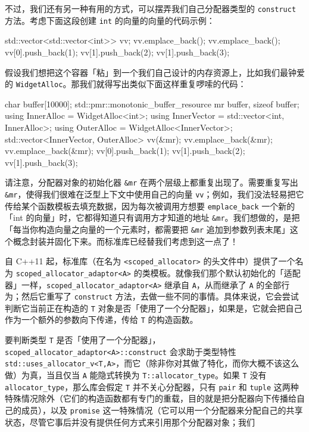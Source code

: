 不过，我们还有另一种有用的方式，可以摆弄我们自己分配器类型的 \texttt{construct} 方法。考虑下面这段创建 \texttt{int} 的向量的向量的代码示例：

\begin{codebox}[cpp]
    std::vector<std::vector<int>> vv;
    vv.emplace_back();
    vv.emplace_back();
    vv[0].push_back(1);
    vv[1].push_back(2);
    vv[1].push_back(3);
\end{codebox}

假设我们想把这个容器「粘」到一个我们自己设计的内存资源上，比如我们最钟爱的 \texttt{Widget\allowbreak{}Alloc}。那我们就得写出类似下面这样重复啰嗦的代码：

\begin{codebox}[cpp]
    char buffer[10000];
    std::pmr::monotonic_buffer_resource mr {buffer, sizeof buffer};
    using InnerAlloc = WidgetAlloc<int>;
    using InnerVector = std::vector<int, InnerAlloc>;
    using OuterAlloc = WidgetAlloc<InnerVector>;
    std::vector<InnerVector, OuterAlloc> vv(&mr);
    vv.emplace_back(&mr);
    vv.emplace_back(&mr);
    vv[0].push_back(1);
    vv[1].push_back(2);
    vv[1].push_back(3);
\end{codebox}

请注意，分配器对象的初始化器 \texttt{\&mr} 在两个层级上都重复出现了。需要重复写出 \texttt{\&mr}，使得我们很难在泛型上下文中使用自己的向量 \texttt{vv}；例如，我们没法轻易把它传给某个函数模板去填充数据，因为每次被调用方想要 \texttt{emplace\_\allowbreak{}back} 一个新的「int 的向量」时，它都得知道只有调用方才知道的地址 \texttt{\&mr}。我们想做的，是把「每当你构造向量之向量的一个元素时，都需要把 \texttt{\&mr} 追加到参数列表末尾」这个概念封装并固化下来。而标准库已经替我们考虑到这一点了！

自 C++11 起，标准库（在名为 \texttt{<scoped\_\allowbreak{}allocator>\allowbreak{}} 的头文件中）提供了一个名为 \texttt{scoped\_\allowbreak{}allocator\_\allowbreak{}adaptor<\allowbreak{}A>\allowbreak{}} 的类模板。就像我们那个默认初始化的「适配器」一样，\texttt{scoped\_\allowbreak{}allocator\_\allowbreak{}adaptor<\allowbreak{}A>\allowbreak{}} 继承自 \texttt{A}，从而继承了 \texttt{A} 的全部行为；然后它重写了 \texttt{construct} 方法，去做一些不同的事情。具体来说，它会尝试判断它当前正在构造的 \texttt{T} 对象是否「使用了一个分配器」，如果是，它就会把自己作为一个额外的参数向下传递，传给 \texttt{T} 的构造函数。

要判断类型 \texttt{T} 是否「使用了一个分配器」，\texttt{scoped\_\allowbreak{}allocator\_\allowbreak{}adaptor<\allowbreak{}A>\allowbreak{}::\allowbreak{}construct} 会求助于类型特性 \texttt{std::\allowbreak{}uses\_\allowbreak{}allocator\_\allowbreak{}v<\allowbreak{}T,\allowbreak{}A>\allowbreak{}}，而它（除非你对其做了特化，而你大概不该这么做）为真，当且仅当 \texttt{A} 能隐式转换为 \texttt{T::\allowbreak{}allocator\_\allowbreak{}type}。如果 \texttt{T} 没有 \texttt{allocator\_\allowbreak{}type}，那么库会假定 \texttt{T} 并不关心分配器，只有 \texttt{pair} 和 \texttt{tuple} 这两种特殊情况除外（它们的构造函数都有专门的重载，目的就是把分配器向下传播给自己的成员），以及 \texttt{promise} 这一特殊情况（它可以用一个分配器来分配自己的共享状态，尽管它事后并没有提供任何方式来引用那个分配器对象；我们

